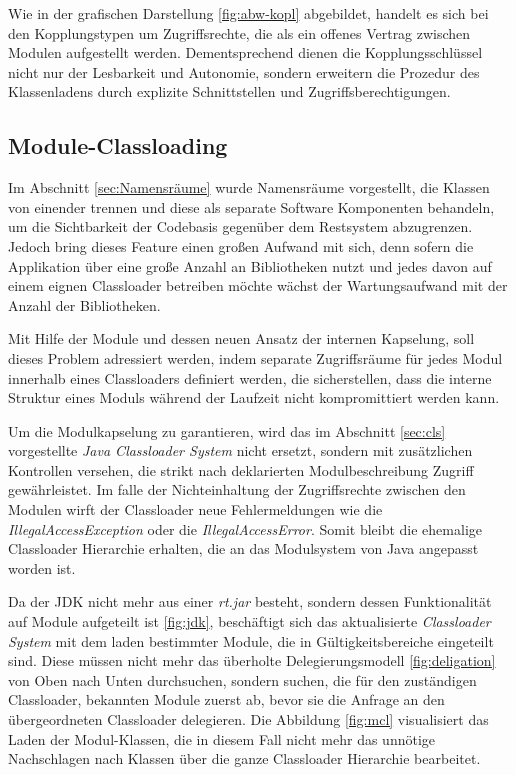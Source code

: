   Wie in der grafischen Darstellung \ref{fig:abw-kopl} abgebildet, handelt es sich bei den Kopplungstypen um Zugriffsrechte, die als ein offenes Vertrag zwischen Modulen aufgestellt werden. Dementsprechend dienen die Kopplungsschlüssel nicht nur der Lesbarkeit und Autonomie, sondern erweitern die Prozedur des Klassenladens durch explizite Schnittstellen und Zugriffsberechtigungen.

  \subsection{Module-Classloading}
  Im Abschnitt \ref{sec:Namensräume} wurde Namensräume vorgestellt, die Klassen von einender trennen und diese als separate Software Komponenten behandeln, um die Sichtbarkeit der Codebasis gegenüber dem Restsystem abzugrenzen. Jedoch bring dieses Feature einen großen Aufwand mit sich, denn sofern die Applikation über eine große Anzahl an Bibliotheken nutzt und jedes davon auf einem eignen Classloader betreiben möchte wächst der Wartungsaufwand mit der Anzahl der Bibliotheken.

  Mit Hilfe der Module und dessen neuen Ansatz der internen Kapselung, soll dieses Problem adressiert werden, indem separate Zugriffsräume für jedes Modul innerhalb eines Classloaders definiert werden, die sicherstellen, dass die interne Struktur eines Moduls während der Laufzeit nicht kompromittiert werden kann.

  Um die Modulkapselung zu garantieren, wird das im Abschnitt \ref{sec:cls} vorgestellte \textit{Java Classloader System} nicht ersetzt, sondern mit zusätzlichen Kontrollen versehen, die strikt nach deklarierten Modulbeschreibung Zugriff gewährleistet. 
  Im falle der Nichteinhaltung der Zugriffsrechte zwischen den Modulen wirft der Classloader neue Fehlermeldungen wie die \textit{IllegalAccessException} oder die \textit{IllegalAccessError}. Somit bleibt die ehemalige Classloader Hierarchie erhalten, die an das Modulsystem von Java angepasst worden ist.\bigbreak

  Da der JDK nicht mehr aus einer \textit{rt.jar} besteht, sondern dessen Funktionalität auf Module aufgeteilt ist \ref{fig:jdk}, beschäftigt sich das aktualisierte \textit{Classloader System} mit dem laden bestimmter Module, die in Gültigkeitsbereiche eingeteilt sind. Diese müssen nicht mehr das überholte Delegierungsmodell \ref{fig:deligation} von Oben nach Unten durchsuchen, sondern suchen, die für den zuständigen Classloader, bekannten Module zuerst ab, bevor sie die Anfrage an den übergeordneten Classloader delegieren. 
  Die Abbildung \ref{fig:mcl} visualisiert das Laden der Modul-Klassen, die in diesem Fall nicht mehr das unnötige Nachschlagen nach Klassen über die ganze Classloader Hierarchie bearbeitet.

